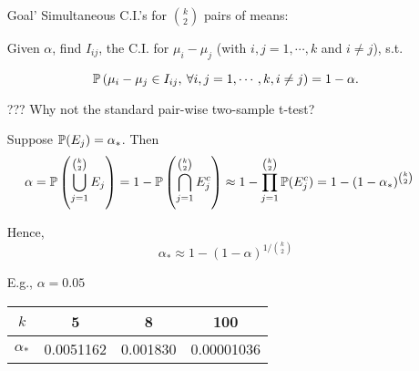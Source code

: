 \begin{frame}[fragile]
\begin{enumerate}
	\item[Goal'] Simultaneous C.I.'s for ${k\choose 2}$ pairs of means:
	\item[] Given $\alpha$, find $I_{ij}$, the C.I. for $\mu_i-\mu_j$ (with $i,j=1,\cdots,k$ and $i\ne j$), s.t.
	\item[]
		\[
			\mathbb{P}\left(\mu_i-\mu_j\in I_{ij},\: \forall i,j=1,\cdots, k, i\ne j\right) = 1-\alpha.
		\]
\end{enumerate}

\end{frame}
\begin{frame}[fragile]

	\begin{enumerate}
		\item[???] Why not the standard pair-wise two-sample t-test?
		\item[] Suppose $\mathbb{P}(E_j)=\alpha_*$. Then
			\begin{align*}
\alpha & = \mathbb{P} \left(\bigcup_{j=1}^{{k\choose 2}}E_j\right)
= 1-  \mathbb{P} \left(\bigcap_{j=1}^{{k\choose 2}}E_j^c \right)
\approx 1- \prod_{j=1}^{k\choose 2} \mathbb{P}(E_j^c)
= 1-(1-\alpha_*)^{k\choose 2}
			\end{align*}
		\item[] Hence,
		\[
			\alpha_* \approx  1-(1-\alpha)^{1/{k\choose 2}}
		\]
		\vfill
	\item[] E.g., $\alpha=0.05$
		\begin{center}
			\begin{tabular}{c|ccc}
				$k$ & 5 & 8 & 100 \\
				\hline
				$\alpha_*$ & 0.0051162 & 0.001830 & 0.00001036
			\end{tabular}
		\end{center}
	\end{enumerate}
\end{frame}
